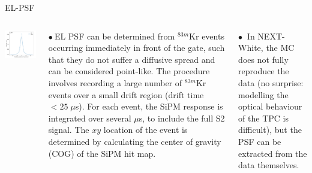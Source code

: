 \documentclass [aspectratio=169]{beamer}
\begin{document}
\begin{frame}{EL-PSF}

\begin{columns}
\includegraphics[scale=0.40]{ELPSF.png}

$\bullet~$EL PSF can be determined from $^{83m}$Kr events occurring immediately in front of the gate, such that they do not suffer a diffusive spread and can be considered point-like. The procedure involves recording a large number of $^{83m}$Kr events over a small drift region (drift time $<25\;\mu$s). For each event, the SiPM response is integrated over several $\mu$s, to include the full S2 signal. The $xy$ location of the event is determined by calculating the center of gravity (COG) of the SiPM hit map. 

$\bullet~$ In NEXT-White, the MC does not fully reproduce the data (no surprise: modelling the optical behaviour of the TPC is difficult), but the PSF can be extracted from the data themselves. 
\end{columns}
\end{frame}
\end{document}
